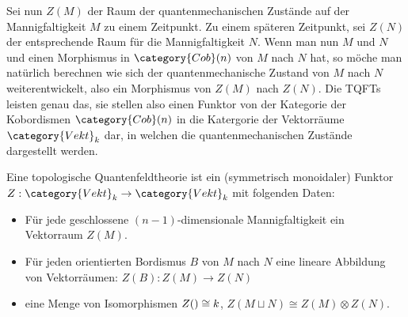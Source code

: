 Sei nun $Z(M)$ der Raum der quantenmechanischen Zustände auf der Mannigfaltigkeit $M$ zu einem Zeitpunkt. Zu einem späteren Zeitpunkt, sei $Z(N)$ der entsprechende
Raum für die Mannigfaltigkeit $N$. Wenn man nun $M$ und $N$ und einen Morphismus in $\category{Cob}(n)$ von $M$ nach $N$ hat, so möche man natürlich berechnen
wie sich der quantenmechanische Zustand von $M$ nach $N$ weiterentwickelt, also ein Morphismus von $Z(M)$ nach $Z(N)$. Die TQFTs leisten genau das, sie stellen also
einen Funktor von der Kategorie der Kobordismen $\category{Cob}(n)$ in die Katergorie der Vektorräume $\category{Vekt}_k$ dar, in welchen die quantenmechanischen
Zustände dargestellt werden.

\begin{Def}
  Eine topologische Quantenfeldtheorie ist ein (symmetrisch monoidaler) Funktor $Z: \category{Vekt}_k \rightarrow \category{Vekt}_k$ mit folgenden Daten:
  \begin{itemize}
    \item Für jede geschlossene $(n-1)$-dimensionale Mannigfaltigkeit ein Vektorraum $Z(M)$.
    \item Für jeden orientierten Bordismus $B$ von $M$ nach $N$ eine lineare Abbildung von Vektorräumen: $Z(B): Z(M) \rightarrow Z(N)$
    \item eine Menge von Isomorphismen $Z(\empty) \cong k$, $Z(M\sqcup N) \cong Z(M) \otimes Z(N)$.
  \end{itemize}
\end{Def}


